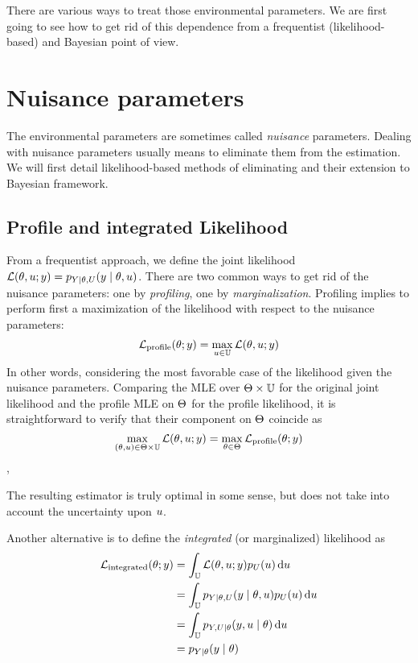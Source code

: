 \documentclass[../../Main_ManuscritThese.tex]{subfiles}
\begin{document}
There are various ways to treat those environmental parameters. We are first going to see how to get rid of this dependence from a frequentist (likelihood-based) and Bayesian point of view.


\section{Nuisance parameters}
\label{sec:nuisance_parameters}
The environmental parameters are sometimes called \emph{nuisance} parameters.
Dealing with nuisance parameters usually means to eliminate them from the estimation. We will first detail likelihood-based methods of eliminating and their extension to Bayesian framework. 
\subsection{Profile and integrated Likelihood}
From a frequentist approach, we define the joint likelihood $\mathcal{L}(\theta, u ;y) = p_{Y\mid \theta,U}(y \mid \theta, u)$. There are two common ways to get rid of the nuisance parameters: one by \emph{profiling}, one by \emph{marginalization}.
Profiling implies to perform first a maximization of the likelihood with respect to the nuisance parameters:
\begin{equation}
  \label{eq:eq:def_profile_lik}
  \mathcal{L}_{\mathrm{profile}}(\theta;y) = \max_{u \in \mathbb{U}} \mathcal{L}(\theta,u;y)
\end{equation}
In other words, considering the most favorable case of the likelihood given the nuisance parameters.
Comparing the MLE over $\Theta \times \mathbb{U}$ for the original joint likelihood and the profile MLE on $\Theta$ for the profile likelihood, it is straightforward to verify that their component on $\Theta$ coincide as
\begin{equation}
  \max_{(\theta ,u) \in \Theta\times \mathbb{U}} \mathcal{L}(\theta,u;y) = \max_{\theta\in \Theta} \mathcal{L}_{\mathrm{profile}}(\theta;y)
\end{equation},

The resulting estimator is truly optimal in some sense, but does not take into account the uncertainty upon $u$.

Another alternative is to define the \emph{integrated} (or marginalized) likelihood as
\begin{align}
  \mathcal{L}_{\mathrm{integrated}}(\theta;y) &= \int_{\mathbb{U}} \mathcal{L}(\theta,u;y) p_{U}(u) \,\mathrm{d}u \label{eq:def_int_lik}\\
                                              &=\int_{\mathbb{U}} p_{Y|\theta,U}(y \mid \theta,u) p_{U}(u) \,\mathrm{d}u \\
                                              &=\int_{\mathbb{U}} p_{Y,U|\theta}(y,u \mid \theta)\,\mathrm{d}u \\
  &= p_{Y \mid \theta}(y \mid \theta)
\end{align}
\end{document}
